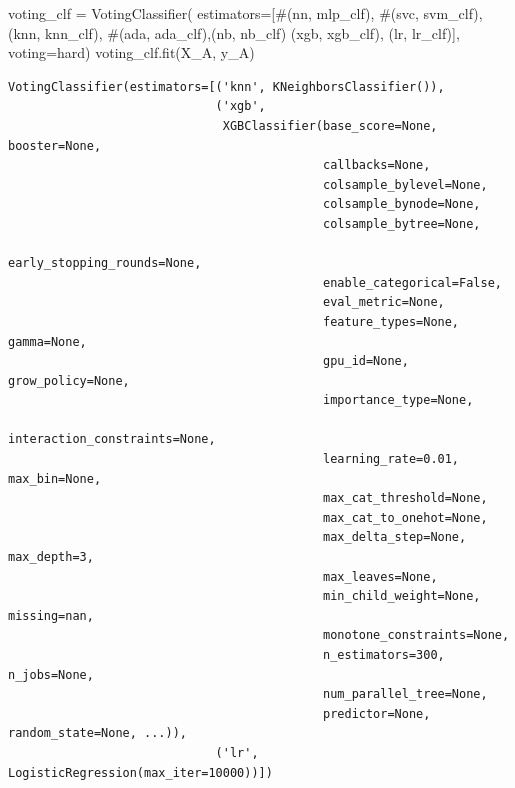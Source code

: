 \documentclass[
  letterpaper,
  DIV=11,
  numbers=noendperiod]{scrartcl}
\newenvironment{Shaded}{\begin{snugshade}}{\end{snugshade}}
\newcommand{\CommentTok}[1]{\textcolor[rgb]{0.37,0.37,0.37}{#1}}
\newcommand{\NormalTok}[1]{\textcolor[rgb]{0.00,0.23,0.31}{#1}}
\newcommand{\OperatorTok}[1]{\textcolor[rgb]{0.37,0.37,0.37}{#1}}
\newcommand{\StringTok}[1]{\textcolor[rgb]{0.13,0.47,0.30}{#1}}
\begin{document}
\begin{Shaded}
\begin{Highlighting}[]
\NormalTok{voting\_clf }\OperatorTok{=}\NormalTok{ VotingClassifier(}
\NormalTok{  estimators}\OperatorTok{=}\NormalTok{[}\CommentTok{\#(\textquotesingle{}nn\textquotesingle{}, mlp\_clf),}
              \CommentTok{\#(\textquotesingle{}svc\textquotesingle{}, svm\_clf),}
\NormalTok{              (}\StringTok{\textquotesingle{}knn\textquotesingle{}}\NormalTok{, knn\_clf), }\CommentTok{\#(\textquotesingle{}ada\textquotesingle{}, ada\_clf),(\textquotesingle{}nb\textquotesingle{}, nb\_clf)}
\NormalTok{              (}\StringTok{\textquotesingle{}xgb\textquotesingle{}}\NormalTok{, xgb\_clf), (}\StringTok{\textquotesingle{}lr\textquotesingle{}}\NormalTok{, lr\_clf)],}
\NormalTok{  voting}\OperatorTok{=}\StringTok{\textquotesingle{}hard\textquotesingle{}}\NormalTok{)}
\NormalTok{voting\_clf.fit(X\_A, y\_A)}
\end{Highlighting}
\end{Shaded}

\begin{verbatim}
VotingClassifier(estimators=[('knn', KNeighborsClassifier()),
                             ('xgb',
                              XGBClassifier(base_score=None, booster=None,
                                            callbacks=None,
                                            colsample_bylevel=None,
                                            colsample_bynode=None,
                                            colsample_bytree=None,
                                            early_stopping_rounds=None,
                                            enable_categorical=False,
                                            eval_metric=None,
                                            feature_types=None, gamma=None,
                                            gpu_id=None, grow_policy=None,
                                            importance_type=None,
                                            interaction_constraints=None,
                                            learning_rate=0.01, max_bin=None,
                                            max_cat_threshold=None,
                                            max_cat_to_onehot=None,
                                            max_delta_step=None, max_depth=3,
                                            max_leaves=None,
                                            min_child_weight=None, missing=nan,
                                            monotone_constraints=None,
                                            n_estimators=300, n_jobs=None,
                                            num_parallel_tree=None,
                                            predictor=None, random_state=None, ...)),
                             ('lr', LogisticRegression(max_iter=10000))])
\end{verbatim}
\end{document}
